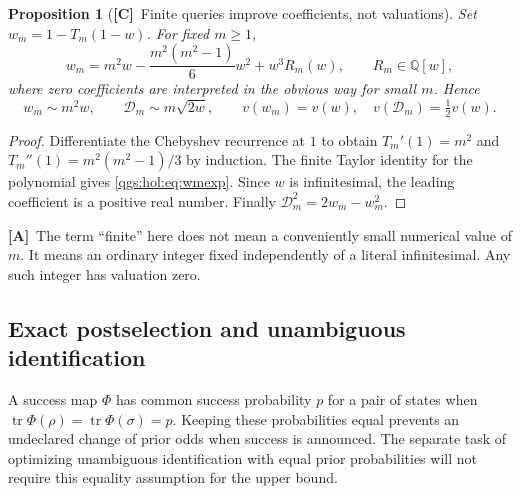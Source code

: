 \documentclass[11pt,oneside]{article}
\numberwithin{equation}{section}
\theoremstyle{plain}
\newtheorem{proposition}[proposition]{Proposition}
\theoremstyle{definition}
\theoremstyle{remark}
\newcommand{\Q}{\mathbb Q}
\newcommand{\TD}{\mathcal D}
\DeclareMathOperator{\tr}{tr}
\newcommand{\TC}{\textcolor{TierC}{\textsf{\bfseries[C]}}}
\newcommand{\TA}{\textcolor{TierA}{\textsf{\bfseries[A]}}}
\begin{document}
\begin{proposition}[\TC\ Finite queries improve coefficients, not valuations]\label{qgs:hol:prop:queryscale}
Set $w_m=1-T_m(1-w)$. For fixed $m\geq1$,
\begin{equation}\label{qgs:hol:eq:wmexp}
 w_m=m^2w-\frac{m^2(m^2-1)}6w^2+w^3R_m(w),\qquad R_m\in\Q[w],
\end{equation}
where zero coefficients are interpreted in the obvious way for small $m$. Hence
\[
 w_m\sim m^2w,\qquad
 \TD_m\sim m\sqrt{2w},\qquad
 v(w_m)=v(w),\quad v(\TD_m)=\tfrac12v(w).
\]
\end{proposition}
\begin{proof}
Differentiate the Chebyshev recurrence at $1$ to obtain $T_m'(1)=m^2$ and $T_m''(1)=m^2(m^2-1)/3$ by induction. The finite Taylor identity for the polynomial gives \eqref{qgs:hol:eq:wmexp}. Since $w$ is infinitesimal, the leading coefficient is a positive real number. Finally $\TD_m^2=2w_m-w_m^2$.
\end{proof}

\TA\ The term ``finite'' here does not mean a conveniently small numerical value of $m$. It means an ordinary integer fixed independently of a literal infinitesimal. Any such integer has valuation zero.

\subsection{Exact postselection and unambiguous identification}
A success map $\Phi$ has common success probability $p$ for a pair of states when $\tr\Phi(\rho)=\tr\Phi(\sigma)=p$. Keeping these probabilities equal prevents an undeclared change of prior odds when success is announced. The separate task of optimizing unambiguous identification with equal prior probabilities will not require this equality assumption for the upper bound.
\end{document}
